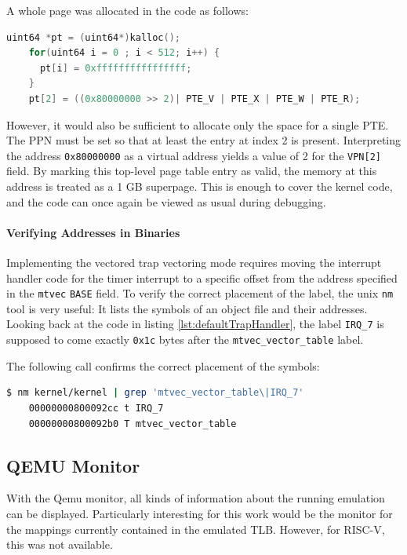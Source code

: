 A whole page was allocated in the code as follows:
\begin{lstlisting}[language=c,float=h!, label={lst:fake_pt}]
    uint64 *pt = (uint64*)kalloc();
    for(uint64 i = 0 ; i < 512; i++) {
      pt[i] = 0xffffffffffffffff;
    }
    pt[2] = ((0x80000000 >> 2)| PTE_V | PTE_X | PTE_W | PTE_R);
\end{lstlisting}
However, it would also be sufficient to allocate only the space for a single PTE. The PPN must be set so that at least the entry at index 2 is present. Interpreting the address \texttt{0x80000000} as a virtual address yields a value of 2 for the \texttt{VPN[2]} field. By marking this top-level page table entry as valid, the memory at this address is treated as a 1 GB superpage. This is enough to cover the kernel code, and the code can once again be viewed as usual during debugging.

\paragraph{Verifying Addresses in Binaries} Implementing the vectored trap vectoring mode
requires moving the interrupt handler code for the timer interrupt to a specific offset
from the address specified in the \texttt{mtvec} \texttt{BASE} field.
To verify the correct placement of the label, the unix \texttt{nm} tool is very useful:
It lists the symbols of an object file and their addresses.
Looking back at the code in listing \ref{lst:defaultTrapHandler}, the label \texttt{IRQ\_7}
is supposed to come exactly \texttt{0x1c} bytes after the \texttt{mtvec\_vector\_table} label.

The following call confirms the correct placement of the symbols:

\begin{lstlisting}[language={sh}]
    $ nm kernel/kernel | grep 'mtvec_vector_table\|IRQ_7'
    00000000800092cc t IRQ_7
    00000000800092b0 T mtvec_vector_table
\end{lstlisting}


\subsection{QEMU Monitor}
With the Qemu monitor, all kinds of information about the running emulation can be displayed. Particularly interesting for this work would be the monitor for the mappings currently contained in the emulated TLB. However, for RISC-V, this was not available.

